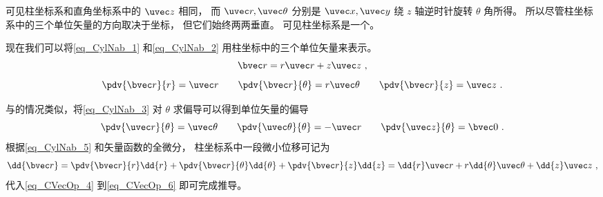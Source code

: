 可见柱坐标系和直角坐标系中的 $\uvec z$ 相同， 而 $\uvec r, \uvec \theta$ 分别是 $\uvec x, \uvec y$ 绕 $z$ 轴逆时针旋转 $\theta$ 角所得。 所以尽管柱坐标系中的三个单位矢量的方向取决于坐标， 但它们始终两两垂直。 可见柱坐标系是一个。

现在我们可以将\autoref{eq_CylNab_1} 和\autoref{eq_CylNab_2} 用柱坐标中的三个单位矢量来表示。
\begin{equation}
\bvec r = r\uvec r + z\uvec z~,
\end{equation}
\begin{equation}\label{eq_CylNab_5}
\pdv{\bvec r}{r} = \uvec r \qquad \pdv{\bvec r}{\theta} = r\uvec \theta \qquad \pdv{\bvec r}{z} = \uvec z~.
\end{equation}

与的情况类似，将\autoref{eq_CylNab_3} 对 $\theta$ 求偏导可以得到单位矢量的偏导
\begin{equation}
\pdv{\uvec r}{\theta} = \uvec \theta \qquad
\pdv{\uvec \theta}{\theta} = -\uvec r \qquad
\pdv{\uvec z}{\theta} = \bvec 0~.
\end{equation}
根据\autoref{eq_CylNab_5} 和矢量函数的全微分，%
柱坐标系中一段微小位移可记为
\begin{equation}\label{eq_CylNab_7}
\dd{\bvec r} = \pdv{\bvec r}{r}\dd{r} + \pdv{\bvec r}{\theta}\dd{\theta} + \pdv{\bvec r}{z}\dd{z} = \dd{r}\uvec r + r\dd{\theta} \uvec \theta + \dd{z} \uvec z~,
\end{equation}
代入\autoref{eq_CVecOp_4} 到\autoref{eq_CVecOp_6} 即可完成推导。
